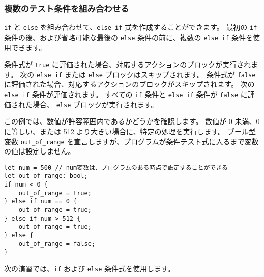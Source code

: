 \subsubsection{複数のテスト条件を組み合わせる}

\texttt{if} と \texttt{else} を組み合わせて、\texttt{else if} 式を作成することができます。 最初の \texttt{if} 条件の後、および省略可能な最後の \texttt{else} 条件の前に、複数の \texttt{else if} 条件を使用できます。

条件式が \texttt{true} に評価された場合、対応するアクションのブロックが実行されます。 次の \texttt{else if} または \texttt{else} ブロックはスキップされます。 条件式が \texttt{false} に評価された場合、対応するアクションのブロックがスキップされます。 次の \texttt{else if} 条件が評価されます。 すべての \texttt{if} 条件と \texttt{else if} 条件が \texttt{false} に評価された場合、 \texttt{else} ブロックが実行されます。

この例では、数値が許容範囲内であるかどうかを確認します。 数値が 0 未満、0 に等しい、または 512 より大きい場合に、特定の処理を実行します。 ブール型変数 \texttt{out\_of\_range} を宣言しますが、プログラムが条件テスト式に入るまで変数の値は設定しません。


\begin{lstlisting}[numbers=none]
let num = 500 // num変数は、プログラムのある時点で設定することができる
let out_of_range: bool;
if num < 0 {
    out_of_range = true;
} else if num == 0 {
    out_of_range = true;
} else if num > 512 {
    out_of_range = true;
} else {
    out_of_range = false;
}
\end{lstlisting}

次の演習では、\texttt{if} および \texttt{else} 条件式を使用します。

